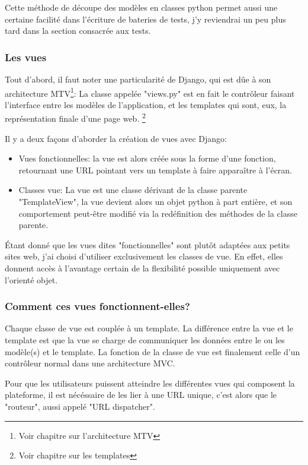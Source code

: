 \documentclass[12pt,table,a4paper]{report}
\begin{document}
Cette méthode de découpe des modèles en classes python permet aussi une certaine facilité dans l'écriture de bateries de tests, j'y reviendrai un peu plus tard dans la section consacrée aux tests.

\subsubsection{Les vues}
Tout d'abord, il faut noter une particularité de Django, qui est dûe à son architecture MTV\footnote{Voir chapitre sur l'architecture MTV}: La classe appelée "views.py" est en fait le contrôleur faisant l'interface entre les modèles de l'application, et les templates qui sont, eux, la représentation finale d'une page web. \footnote{Voir chapitre sur les templates}

Il y a deux façons d'aborder la création de vues avec Django:

\begin{itemize}
	\item{Vues fonctionnelles: la vue est alors créée sous la forme d'une fonction, retournant une URL pointant vers un template à faire apparaître à l'écran.}
	\item{Classes vue: La vue est une classe dérivant de la classe parente "TemplateView", la vue devient alors un objet python à part entière, et son comportement peut-être modifié via la redéfinition des méthodes de la classe parente.}
\end{itemize}

Étant donné que les vues dites "fonctionnelles" sont plutôt adaptées aux petits sites web, j'ai choisi d'utiliser exclusivement les classes de vue. En effet, elles donnent accès à l'avantage certain de la flexibilité possible uniquement avec l'orienté objet.

\subsubsection{Comment ces vues fonctionnent-elles?}

Chaque classe de vue est couplée à un template. La différence entre la vue et le template est que la vue se charge de communiquer les données entre le ou les modèle(s) et le template. La fonction de la classe de vue est finalement celle d'un contrôleur normal dans une architecture MVC.

Pour que les utilisateurs puissent atteindre les différentes vues qui composent la plateforme, il est nécéssaire de les lier à une URL unique, c'est alors que le "routeur", aussi appelé "URL dispatcher".
\end{document}
